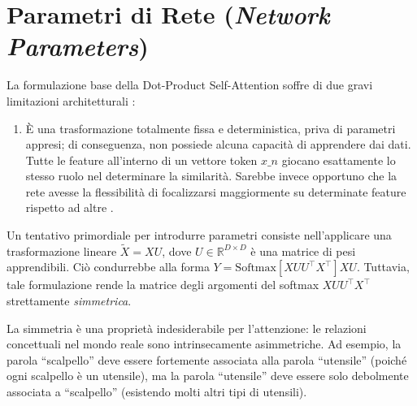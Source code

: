 \newpage

\section{Parametri di Rete (\textit{Network Parameters})} La formulazione base della Dot-Product Self-Attention soffre di due gravi limitazioni architetturali :
\begin{enumerate}
\item È una trasformazione totalmente fissa e deterministica, priva di parametri appresi; di conseguenza, non possiede alcuna capacità di apprendere dai dati. Tutte le feature all'interno di un vettore token $x\_n$ giocano esattamente lo stesso ruolo nel determinare la similarità. Sarebbe invece opportuno che la rete avesse la flessibilità di focalizzarsi maggiormente su determinate feature rispetto ad altre .
\end{enumerate}

Un tentativo primordiale per introdurre parametri consiste nell'applicare una trasformazione lineare $\tilde{X} = X U$, dove $U \in \mathbb{R}^{D \times D}$ è una matrice di pesi apprendibili. Ciò condurrebbe alla forma $Y = \text{Softmax}[X U U^\top X^\top] X U$. Tuttavia, tale formulazione rende la matrice degli argomenti del softmax $X U U^\top X^\top$ strettamente \emph{simmetrica}.

La simmetria è una proprietà indesiderabile per l'attenzione: le relazioni concettuali nel mondo reale sono intrinsecamente asimmetriche. Ad esempio, la parola ``scalpello'' deve essere fortemente associata alla parola ``utensile'' (poiché ogni scalpello è un utensile), ma la parola ``utensile'' deve essere solo debolmente associata a ``scalpello'' (esistendo molti altri tipi di utensili).

